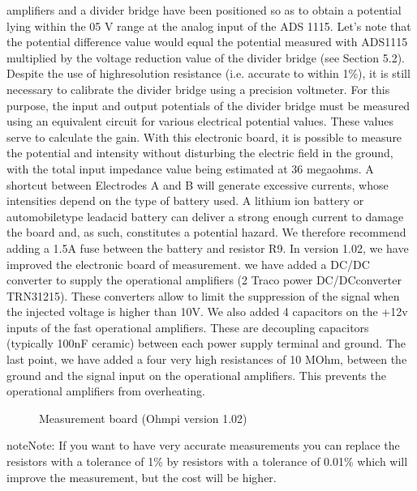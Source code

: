 \documentclass[letterpaper,10pt,english]{sphinxmanual}
\let\sphinxpxdimen\pdfpxdimen\else\newdimen\sphinxpxdimen
\begin{document}
amplifiers and a divider bridge have been positioned so as to obtain a potential lying within the 0\sphinxhyphen{}5 V range at the analog input of the ADS 1115.
Let’s note that the potential difference value would equal the potential measured with ADS1115 multiplied by the voltage reduction
value of the divider bridge (see Section 5.2). Despite the use of high\sphinxhyphen{}resolution resistance (i.e. accurate to within 1\%), it is
still necessary to calibrate the divider bridge using a precision voltmeter. For this purpose, the input and output potentials
of the divider bridge must be measured using an equivalent circuit for various electrical potential values. These values serve
to calculate the gain. With this electronic board, it is possible to measure the potential and intensity without disturbing the
electric field in the ground, with the total input impedance value being estimated at 36 mega\sphinxhyphen{}ohms.
A shortcut between Electrodes A and B will generate excessive currents, whose intensities depend on the type of battery used.
A lithium ion battery or automobile\sphinxhyphen{}type lead\sphinxhyphen{}acid battery can deliver a strong enough current to damage the board and, as such,
constitutes a potential hazard. We therefore recommend adding a 1.5\sphinxhyphen{}A fuse between the battery and resistor R9.
In version 1.02, we have improved the electronic board of measurement. we have added a DC/DC converter to supply the operational amplifiers
(2 Traco power DC/DCconverter TRN3\sphinxhyphen{}1215). These converters allow to limit the suppression of the signal when the injected voltage is higher than 10V.
We also added 4 capacitors on the +12v inputs of the fast operational amplifiers. These are decoupling capacitors (typically 100nF ceramic)
between each power supply terminal and ground. The last point, we have added a four very high resistances of 10 MOhm, between the ground and
the signal input on the operational amplifiers. This prevents the operational amplifiers from overheating.

\begin{figure}[htbp]
\centering
\capstart

\noindent\sphinxincludegraphics[width=800\sphinxpxdimen,height=400\sphinxpxdimen]{{schema_measurement_board1_02}.png}
\caption{Measurement board (Ohmpi version 1.02)}\label{\detokenize{V2_00:id1}}\end{figure}

\begin{sphinxadmonition}{note}{Note:}
\sphinxAtStartPar
If you want to have very accurate measurements you can replace the resistors with a tolerance of 1\% by resistors with a tolerance of 0.01\% which will improve the measurement, but the cost will be higher.
\end{sphinxadmonition}
\end{document}
